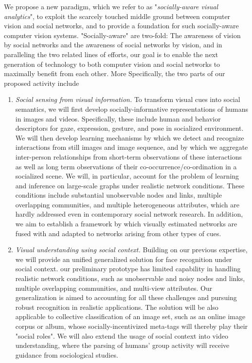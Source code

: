 We propose a new paradigm, which we refer to as "\emph{socially-aware visual analytics}", to exploit the scarcely touched middle ground between computer vision and social networks, and to provide a foundation for such socially-aware computer vision systems. "Socially-aware" are two-fold: The awareness of vision by social networks and the awareness of social networks by vision, and in paralleling the two related lines of efforts, our goal is to enable the next generation of technology to both computer vision and social networks to maximally benefit from each other.  More Specifically, the two parts of our proposed activity include 
\begin{enumerate}
\item \vspace{-0.05in}\emph{Social sensing from visual information.} To transform visual cues into social semantics, we will first develop socially-informative representations of humans in images and videos. Specifically, these include human and behavior descriptors for gaze, expression, gesture, and pose in socialized environment. We will then develop learning mechanisms by which we detect and recognize interactions from still images and image sequence, and by which we aggregate inter-person relationships from short-term observations of these interactions as well as long term observations of their co-occurrence/co-ordination in a socialized scene. We will, in particular, account for the problem of learning and inference on large-scale graphs under realistic network conditions. These conditions include substantial unobservable nodes and links, multiple overlapping communities, and multiple heterogeneous attributes, which are hardly addressed even in contemporary social network research. In addition, we aim to establish a framework by which visually estimated networks are fused with and adapted to networks arising from other types of cues.
\item \vspace{-0.05in}\emph{Visual understanding using social context.} Building on our previous expertise, we will provide an unified generalized solution for face recognition under social context. our preliminary prototype has limited capability in handling realistic network conditions, such as unobservable and noisy nodes and links, multiple overlapping communities, and multi-view attributes. Our generalization is aimed to accounting for all these challenges and pursuing robust recognition in realistic applications. The solution will be also applicable to collective classification of an image set, such as an online image corpus or album, whose socially-incentivized meta-tags will thereby play their "social roles". We will also extend the usage of social context into video understanding, where the parsing of humans' group activity will receive guidance from sociological studies.

\end{enumerate}
